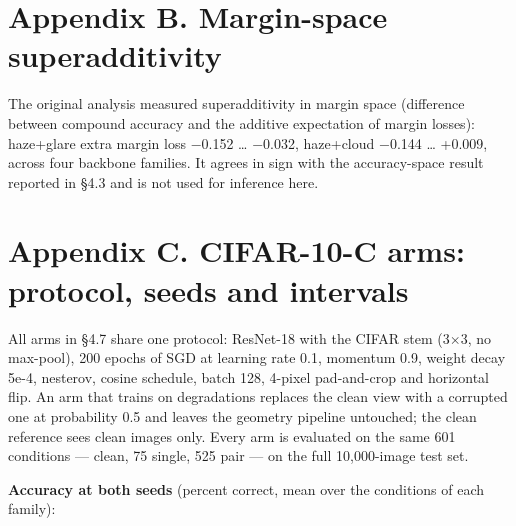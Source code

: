 \section{Appendix B. Margin-space superadditivity}
The original analysis measured superadditivity in margin space (difference between compound accuracy and the additive expectation of margin losses): haze+glare extra margin loss $-$0.152 … $-$0.032, haze+cloud $-$0.144 … +0.009, across four backbone families. It agrees in sign with the accuracy-space result reported in §4.3 and is not used for inference here.

\section{Appendix C. CIFAR-10-C arms: protocol, seeds and intervals}
All arms in §4.7 share one protocol: ResNet-18 with the CIFAR stem (3$\times$3, no max-pool), 200 epochs of SGD at learning rate 0.1, momentum 0.9, weight decay 5e-4, nesterov, cosine schedule, batch 128, 4-pixel pad-and-crop and horizontal flip. An arm that trains on degradations replaces the clean view with a corrupted one at probability 0.5 and leaves the geometry pipeline untouched; the clean reference sees clean images only. Every arm is evaluated on the same 601 conditions --- clean, 75 single, 525 pair --- on the full 10,000-image test set.

\noindent{}
\textbf{Accuracy at both seeds} (percent correct, mean over the conditions of each family):

